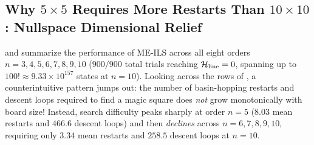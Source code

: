 \subsection{Why \texorpdfstring{$5\times 5$}{5x5} Requires More Restarts Than \texorpdfstring{$10\times 10$}{10x10}: Nullspace Dimensional Relief}

 and  summarize the performance of ME-ILS across all eight orders $n = 3, 4, 5, 6, 7, 8, 9, 10$ ($900 / 900$ total trials reaching $\mathcal{H}_{\mathrm{line}} = 0$, spanning up to $100! \approx 9.33\times 10^{157}$ states at $n=10$). Looking across the rows of , a counterintuitive pattern jumps out: the number of basin-hopping restarts and descent loops required to find a magic square does \emph{not} grow monotonically with board size! Instead, search difficulty peaks sharply at order $n=5$ ($8.03$ mean restarts and $466.6$ descent loops) and then \emph{declines} across $n=6,7,8,9,10$, requiring only $3.34$ mean restarts and $258.5$ descent loops at $n=10$.

